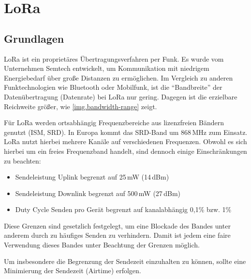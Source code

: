 \chapter{LoRa}\label{chp.lora}



\section{Grundlagen}\label{sec.lora.basics}
LoRa ist ein proprietäres Übertragungsverfahren per Funk.
Es wurde vom Unternehmen Semtech entwickelt, um Kommunikation mit niedrigem Energiebedarf über große Distanzen zu ermöglichen.
Im Vergleich zu anderen Funktechnologien wie Bluetooth oder Mobilfunk, ist die "`Bandbreite"' der Datenübertragung (Datenrate) bei LoRa nur gering.
Dagegen ist die erzielbare Reichweite größer, wie \autoref{img.bandwidth-range} zeigt.
\cite{semtech}


Für LoRa werden ortsabhängig Frequenzbereiche aus lizenzfreien Bändern genutzt (\gls{ISM}, \gls{SRD}).
In Europa kommt das SRD-Band um 868\,MHz zum Einsatz.
LoRa nutzt hierbei mehrere Kanäle auf verschiedenen Frequenzen.
\cite{loraparameter}
Obwohl es sich hierbei um ein freies Frequenzband handelt, sind dennoch einige Einschränkungen zu beachten:\cite{lorabasics}
\begin{itemize}\singlespacing\setlength\itemsep{-0.2em}
\item Sendeleistung \gls{Uplink} begrenzt auf 25\,mW (14\,dBm)
\item Sendeleistung \gls{Downlink} begrenzt auf 500\,mW (27\,dBm)
\item Duty Cycle Senden pro Gerät begrenzt auf kanalabhängig 0,1\% bzw. 1\%
\end{itemize}
Diese Grenzen sind gesetzlich festgelegt, um eine Blockade des Bandes unter anderem durch zu häufiges Senden zu verhindern.
Damit ist jedem eine faire Verwendung dieses Bandes unter Beachtung der Grenzen möglich.

Um insbesondere die Begrenzung der Sendezeit einzuhalten zu können, sollte eine Minimierung der Sendezeit (\gls{Airtime}) erfolgen.



